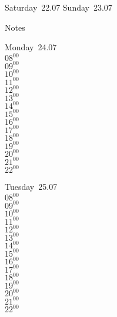 \documentclass[11pt,a4paper]{book}\usepackage[]{graphicx}\usepackage[]{color}
\begin{document}
\begin{weekendbox}
  Saturday~22.07
  \tcblower
  Sunday~23.07
\end{weekendbox} %
\begin{notebox}
  Notes
\end{notebox}
\clearpage
\begin{headerbox}
\end{headerbox}
\begin{weekdaybox}
  Monday~24.07\\
  { 
  \vfill
  $08^{00}$\\
$09^{00}$\\
$10^{00}$\\
$11^{00}$\\
$12^{00}$\\
$13^{00}$\\
$14^{00}$\\
$15^{00}$\\
$16^{00}$\\
$17^{00}$\\
$18^{00}$\\
$19^{00}$\\
$20^{00}$\\
$21^{00}$\\
$22^{00}$\\
  }
\end{weekdaybox}
\begin{weekdaybox}
  Tuesday~25.07\\
  { 
  \vfill
  $08^{00}$\\
$09^{00}$\\
$10^{00}$\\
$11^{00}$\\
$12^{00}$\\
$13^{00}$\\
$14^{00}$\\
$15^{00}$\\
$16^{00}$\\
$17^{00}$\\
$18^{00}$\\
$19^{00}$\\
$20^{00}$\\
$21^{00}$\\
$22^{00}$\\
  }
\end{weekdaybox}
\end{document}
